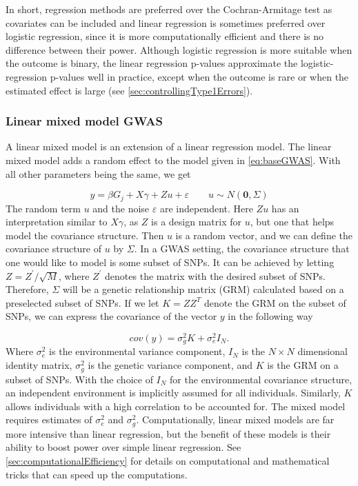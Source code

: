 In short, regression methods are preferred over the Cochran-Armitage test as covariates can be included and linear regression is sometimes preferred over logistic regression, since it is more computationally efficient and there is no difference between their power\cite{sikorska2013gwas,prive2019making,balding2006tutorial,de2015magma}. Although logistic regression is more suitable when the outcome is binary, the linear regression p-values approximate the logistic-regression p-values well in practice, except when the outcome is rare or when the estimated effect is large (see \cref{sec:controllingType1Errors})\cite{pirinen2013efficient}.


\subsubsection{Linear mixed model GWAS} 
A linear mixed model is an extension of a linear regression model. The linear mixed model adds a random effect to the model given in \cref{eq:baseGWAS}. With all other parameters being the same, we get


\begin{equation}\label{eq:baseMixedModelGWAS}
y = \beta G_{j} +  X\gamma + Zu + \varepsilon \qquad u \sim N(\mathbf{0}, \Sigma)
\end{equation}
The random term $ u $ and the noise $ \varepsilon $ are independent. Here $ Zu $ has an interpretation similar to $ X\gamma $, as $ 
Z $ is a design matrix for $ u $, but one that helps model the covariance structure. Then $ u $ is a random 
vector, and we can define the covariance structure of $ u $ by $ \Sigma $. In a GWAS setting, the covariance structure that one would like to model is some subset of SNPs. It can be achieved by letting $ Z = Z^{'}/\sqrt{M} $, where $ Z^{'} $ denotes the matrix with the desired subset of SNPs. Therefore, $ \Sigma $ will be a genetic relationship matrix (GRM) calculated based on a preselected subset of SNPs. If we let $ K = ZZ^{T} $ denote the GRM on the subset of SNPs, we can express the covariance of the vector $ y $ in the following way

\begin{equation} \label{eq:MixedModelGWASCovariance}
cov(y) = \sigma_g^2K + \sigma^2_e I_N.
\end{equation}
Where $ \sigma^2_e $ is the environmental variance component, $ I_N $ is the $ N \times N $ dimensional identity matrix, $ \sigma_g^2 $ is the genetic variance component, and $ K $ is the GRM on a subset of SNPs. With the choice of $ I_N $ for the environmental covariance structure, an independent environment is implicitly assumed for all individuals. Similarly, $ K $ allows individuals with a high correlation to be accounted for. The mixed model requires estimates of $ \sigma_e^2 $ and $ \sigma_g^2 $. Computationally, linear mixed models are far more intensive than linear regression, but the benefit of these models is their ability to boost power over simple linear regression. See \cref{sec:computationalEfficiency} for details on computational and mathematical tricks that can speed up the computations.


